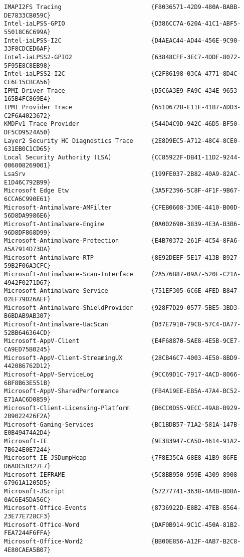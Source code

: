 \documentclass{report}
\begin{document}
\begin{lstlisting}[breaklines=true,basicstyle=\tiny]
IMAPI2FS Tracing                         {F8036571-42D9-480A-BABB-DE7833CB059C}
Intel-iaLPSS-GPIO                        {D386CC7A-620A-41C1-ABF5-55018C6C699A}
Intel-iaLPSS-I2C                         {D4AEAC44-AD44-456E-9C90-33F8CDCED6AF}
Intel-iaLPSS2-GPIO2                      {63848CFF-3EC7-4DDF-8072-5F95E8C8EB98}
Intel-iaLPSS2-I2C                        {C2F86198-03CA-4771-8D4C-CE6E15CBCA56}
IPMI Driver Trace                        {D5C6A3E9-FA9C-434E-9653-165B4FC869E4}
IPMI Provider Trace                      {651D672B-E11F-41B7-ADD3-C2F6A4023672}
KMDFv1 Trace Provider                    {544D4C9D-942C-46D5-BF50-DF5CD9524A50}
Layer2 Security HC Diagnostics Trace     {2E8D9EC5-A712-48C4-8CE0-631EB0C1CD65}
Local Security Authority (LSA)           {CC85922F-DB41-11D2-9244-006008269001}
LsaSrv                                   {199FE037-2B82-40A9-82AC-E1D46C792B99}
Microsoft Edge Etw                       {3A5F2396-5C8F-4F1F-9B67-6CCA6C990E61}
Microsoft-Antimalware-AMFilter           {CFEB0608-330E-4410-B00D-56D8DA9986E6}
Microsoft-Antimalware-Engine             {0A002690-3839-4E3A-B3B6-96D8DF868D99}
Microsoft-Antimalware-Protection         {E4B70372-261F-4C54-8FA6-A5A7914D73DA}
Microsoft-Antimalware-RTP                {8E92DEEF-5E17-413B-B927-59B2F06A3CFC}
Microsoft-Antimalware-Scan-Interface     {2A576B87-09A7-520E-C21A-4942F0271D67}
Microsoft-Antimalware-Service            {751EF305-6C6E-4FED-B847-02EF79D26AEF}
Microsoft-Antimalware-ShieldProvider     {928F7D29-0577-5BE5-3BD3-B6BDAB9AB307}
Microsoft-Antimalware-UacScan            {D37E7910-79C8-57C4-DA77-52BB646364CD}
Microsoft-AppV-Client                    {E4F68870-5AE8-4E5B-9CE7-CA9ED75B0245}
Microsoft-AppV-Client-StreamingUX        {28CB46C7-4003-4E50-8BD9-442086762D12}
Microsoft-AppV-ServiceLog                {9CC69D1C-7917-4ACD-8066-6BF8B63E551B}
Microsoft-AppV-SharedPerformance         {FB4A19EE-EB5A-47A4-BC52-E71AAC6D0859}
Microsoft-Client-Licensing-Platform      {B6CC0D55-9ECC-49A8-B929-2B9022426F2A}
Microsoft-Gaming-Services                {BC1BDB57-71A2-581A-147B-E0B49474A2D4}
Microsoft-IE                             {9E3B3947-CA5D-4614-91A2-7B624E0E7244}
Microsoft-IE-JSDumpHeap                  {7F8E35CA-68E8-41B9-86FE-D6ADC5B327E7}
Microsoft-IEFRAME                        {5C8BB950-959E-4309-8908-67961A1205D5}
Microsoft-JScript                        {57277741-3638-4A4B-BDBA-0AC6E45DA56C}
Microsoft-Office-Events                  {8736922D-E8B2-47EB-8564-23E77E728CF3}
Microsoft-Office-Word                    {DAF0B914-9C1C-450A-81B2-FEA7244F6FFA}
Microsoft-Office-Word2                   {BB00E856-A12F-4AB7-B2C8-4E80CAEA5B07}

\end{lstlisting}
\end{document}
